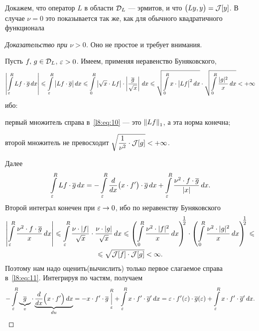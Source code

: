 Докажем, что оператор $L$ в области $\mathcal{D}_L$ --- эрмитов, и что $\big(Ly,y\big)=\mathcal{J}[y]$. В случае $\nu=0$ это показывается так же, как для обычного квадратичного функционала
\begin{proof}[Доказательство при $\nu>0$]
	Оно не простое и требует внимания.
	
	Пусть $f,\,g\in\mathcal{D}_L$, $\varepsilon>0$. Имеем, применяя неравенство Буняковского,
	\begin{equation}\label{l8:eq:10}
		\left|\int\limits_{\varepsilon}^R Lf\cdot\overline{g}\,dx\right|\leqslant\int\limits_{\varepsilon}^R\big|Lf\cdot\overline{g}\big|\,dx\leqslant\int\limits_{0}^R\big|\sqrt{x}\cdot Lf\big|\cdot\left|\frac{\overline{g}}{\sqrt{x}}\right|\,dx\leqslant\sqrt{\int\limits_{0}^R x\cdot\big|Lf\big|^2\,dx}\cdot\sqrt{\int\limits_{0}^R \frac{|g|^2}{x}\,dx}<+\infty
	\end{equation}
	ибо:
	\begin{enumeraterm}
		\item первый множитель справа в~\eqref{l8:eq:10} --- это $\left\|Lf\right\|_1$, а эта норма конечна;
		\item второй множитель не превосходит $\sqrt{\dfrac{1}{\nu^2}\cdot\mathcal{J}[g]}<+\infty$.
	\end{enumeraterm}
	Далее
	\begin{equation}\label{l8:eq:11}
		\hfill\int\limits_{\eps}^R Lf\cdot\overline{g}\,dx=-\int\limits_{\eps}^R\der{}{x}\big(x\cdot f'\big)\cdot\overline{g}\,dx+\int\limits_{\eps}^R\frac{\nu^2\cdot f\cdot\overline{g}}{|x|}\,dx.\hfill
	\end{equation}
	Второй интеграл конечен при $\varepsilon\to0$, ибо по неравенству Буняковского
	\begin{multline}\label{l8:eq:12}
		\left|\int\limits_{\varepsilon}^R\frac{\nu^2\cdot f\cdot\overline{g}}{x}\,dx\right|\leqslant\int\limits_{\varepsilon}^R\frac{\nu\cdot|f|}{\sqrt{x}}\cdot\frac{\nu\cdot|g|}{\sqrt{x}}\,dx\leqslant\left(\int\limits_{0}^R\frac{\nu^2\cdot|f|^2}{x}\,dx\right)^{\!\!\!\textstyle\frac{1}{2}}\cdot\left(\int\limits_{0}^R\frac{\nu^2\cdot|g|^2}{x}\,dx\right)^{\!\!\!\textstyle\frac{1}{2}}\leqslant\\
		\leqslant\sqrt{\mathcal{J}[f]\cdot\mathcal{J}[g]}<\infty.
	\end{multline}
	Поэтому нам надо оценить(вычислить) только первое слагаемое справа в~\eqref{l8:eq:11}. Интегрируя по частям, получаем
	\begin{equation}\label{l8:eq:13}
		-\int\limits_{\eps}^R\underbrace{\overline{g}}_{v}\cdot\underbrace{\der{}{x}\Big(x\cdot f'\Big)\,dx}_{du}=-x\cdot f'\cdot\overline{g}\mathop{\Big|}\limits_{\eps}^R+\int\limits_{\eps}^R x\cdot f'\cdot\overline{g}'\,dx=\eps\cdot f'(\eps)\cdot\overline{g}(\eps)+\int\limits_{\eps}^R x\cdot f'\cdot\overline{g}'\,dx.

\end{equation}
\end{proof}
